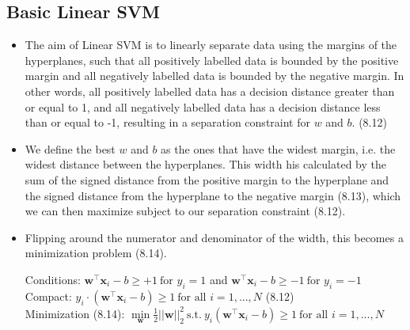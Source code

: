\documentclass[english]{latex4ei/latex4ei_sheet}
\begin{document}
\begin{sectionbox}
\subsection{Basic Linear SVM}
\begin{itemize}
\item The aim of Linear SVM is to linearly separate data using the margins of the hyperplanes, such that all positively labelled data is bounded by the positive margin and all negatively labelled data is bounded by the negative margin. In other words, all positively labelled data has a decision distance greater than or equal to 1, and all negatively labelled data has a decision distance less than or equal to -1, resulting in a separation constraint for $w$ and $b$. (8.12)
\item We define the best $w$ and $b$ as the ones that have the widest margin, i.e. the widest distance between the hyperplanes. This width his calculated by the sum of the signed distance from the positive margin to the hyperplane and the signed distance from the hyperplane to the negative margin (8.13), which we can then maximize subject to our separation constraint (8.12). 
\item Flipping around the numerator and denominator of the width, this becomes a minimization problem (8.14).
\begin{emphbox}
    Conditions: $\mathbf{w^{\top}x}_i-b\ge +1 \ \mbox{for } y_i=
    1$ and $\mathbf{w^{\top}x}_i-b\ge -1 \ \mbox{for } y_i=
    -1$\\
    Compact: $y_i\cdot(\mathbf{w^{\top}x}_i-b)\ge1 \ \text{for all } i=1,...,N$ (8.12)\\
    Minimization (8.14): $\min\limits_\mathbf{w}\frac{1}{2}||\mathbf{w}||^2_2 \ \mbox{s.t.} \ y_i(\mathbf{w^{\top}x}_i-b)\ge1 \ \text{for all } i=1,...,N$
\end{emphbox}
\end{itemize}
\end{sectionbox}
\end{document}
